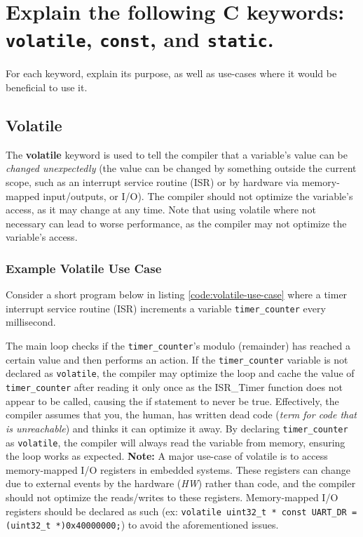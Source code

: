 \documentclass[main.tex]{subfiles}
\begin{document}
\section{Explain the following C keywords: \texttt{volatile}, \texttt{const}, and \texttt{static}.}
For each keyword, explain its purpose, as well as use-cases where it would be beneficial to use it.

\spoilerline

\subsection{Volatile}
The \textbf{volatile} keyword is used to tell the compiler that a variable's value can be \textit{changed unexpectedly} (the value can be changed by something outside the current scope, such as an interrupt service routine (ISR) or by hardware via memory-mapped input/outputs, or I/O). The compiler should not optimize the variable's access, as it may change at any time. Note that using volatile where not necessary can lead to worse performance, as the compiler may not optimize the variable's access. 

\subsubsection{Example Volatile Use Case}
Consider a short program below in listing \ref{code:volatile-use-case} where a timer interrupt service routine (ISR) increments a variable \texttt{timer\_counter} every millisecond. 



\noindent The main loop checks if the \texttt{timer\_counter}'s modulo (remainder) has reached a certain value and then performs an action. If the \texttt{timer\_counter} variable is not declared as \texttt{volatile}, the compiler may optimize the loop and cache the value of \texttt{timer\_counter} after reading it only once as the ISR\_Timer function does not appear to be called, causing the if statement to never be true. Effectively, the compiler assumes that you, the human, has written dead code (\textit{term for code that is unreachable}) and thinks it can optimize it away. By declaring \texttt{timer\_counter} as \texttt{volatile}, the compiler will always read the variable from memory, ensuring the loop works as expected.
\newline
\newline
\textbf{Note:} A major use-case of volatile is to access memory-mapped I/O registers in embedded systems. These registers can change due to external events by the hardware (\textit{HW}) rather than code, and the compiler should not optimize the reads/writes to these registers. Memory-mapped I/O registers should be declared as such (ex: \texttt{volatile uint32\_t * const UART\_DR = (uint32\_t *)0x40000000;}) to avoid the aforementioned issues.
\end{document}
